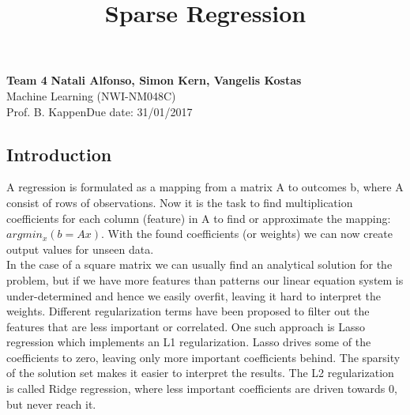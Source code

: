 \documentclass[a4paper, 11pt]{article}
\title{Sparse Regression}
\date{}
\begin{document}
\author{}
\maketitle
\noindent
\large\textbf{Team 4} \hfill \textbf{Natali Alfonso, Simon Kern, Vangelis Kostas} \\
\normalsize Machine Learning (NWI-NM048C)  \\
Prof. B. Kappen\hfill Due date: 31/01/2017 \\


\subsection*{Introduction}
A regression is formulated as a mapping from a matrix A to outcomes b, where A consist of rows of observations. Now it is the task to find multiplication coefficients for each column (feature) in A to find or approximate the mapping: $argmin_x(b=Ax)$. With the found coefficients (or weights) we can now create output values for unseen data.\\
In the case of a square matrix we can usually find an analytical solution for the problem, but if we have more features than patterns our linear equation system is under-determined and hence we easily overfit, leaving it hard to interpret the weights. Different regularization terms have been proposed to filter out the features that are less important or correlated. One such approach is Lasso regression which implements an L1 regularization. Lasso drives some of the coefficients to zero, leaving only more important coefficients behind. The sparsity of the solution set makes it easier to interpret the results. The L2 regularization is called Ridge regression, where less important coefficients are driven towards 0, but never reach it.
\end{document}
